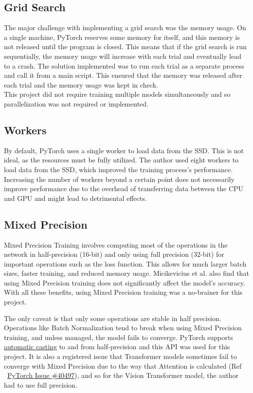 \subsection{Grid Search}
The major challenge with implementing a grid search was the memory usage. On a single machine, PyTorch reserves some memory for itself, and this memory is not released until the program is closed. This means that if the grid search is run sequentially, the memory usage will increase with each trial and eventually lead to a crash. The solution implemented was to run each trial as a separate process and call it from a main script. This ensured that the memory was released after each trial and the memory usage was kept in check.\\
This project did not require training multiple models simultaneously and so parallelization was not required or implemented.

\subsection{Workers}
By default, PyTorch uses a single worker to load data from the SSD. This is not ideal, as the resources must be fully utilized. The author used eight workers to load data from the SSD, which improved the training process's performance. Increasing the number of workers beyond a certain point does not necessarily improve performance due to the overhead of transferring data between the CPU and GPU and might lead to detrimental effects.

\subsection{Mixed Precision}
Mixed Precision Training \cite{micikeviciusMixedPrecisionTraining2017} involves computing most of the operations in the network in half-precision (16-bit) and only using full precision (32-bit) for important operations such as the loss function. This allows for much larger batch sizes, faster training, and reduced memory usage. Micikevicius et al. also find that using Mixed Precision training does not significantly affect the model's accuracy. With all these benefits, using Mixed Precision training was a no-brainer for this project.

The only caveat is that only some operations are stable in half precision. Operations like Batch Normalization tend to break when using Mixed Precision training, and unless managed, the model fails to converge. PyTorch supports \href{https://pytorch.org/docs/stable/notes/amp_examples.html}{automatic casting} to and from half-precision and this API was used for this project. It is also a registered issue that Transformer models sometimes fail to converge with Mixed Precision due to the way that Attention is calculated (Ref ~\href{https://github.com/pytorch/pytorch/issues/40497}{PyTorch Issue \#40497}), and so for the Vision Transformer \cite{dosovitskiyImageWorth16x162021} model, the author had to use full precision.

